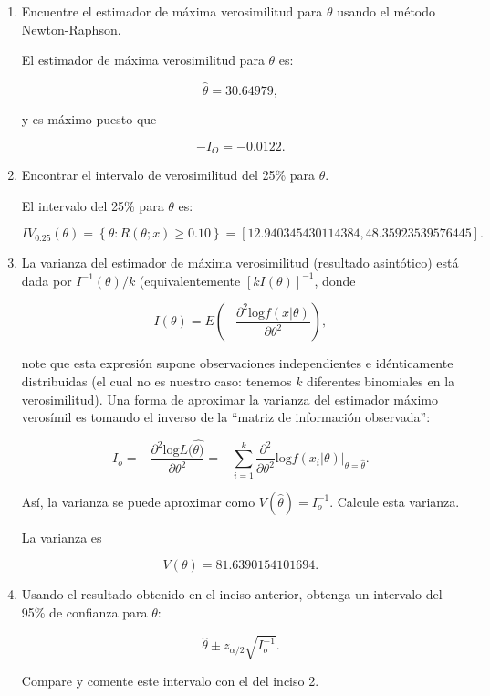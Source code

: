 \documentclass[letterpaper]{article}
\theoremstyle{definition}
\theoremstyle{lemathm}
\theoremstyle{lemathm}
\theoremstyle{lemathm}
\theoremstyle{lemademthm}
\newcommand{\pars}[1]{\left( #1 \right) }
\newcommand{\bracs}[1]{\left[ #1 \right] }
\newcommand{\set}[1]{\left \{ #1 \right\} }
\newcommand{\1}{\mathbbm{1}}
\begin{document}
	\begin{enumerate}
		\item Encuentre el estimador de m\'axima verosimilitud para $\theta$ usando el m\'etodo Newton-Raphson.
		
		El estimador de m\'axima verosimilitud para $\theta$ es:
		
		\[\hat{\theta} = 30.64979,\]
		
		y es máximo puesto que 
		
		\[-I_{O} = -0.0122.\]

		\item Encontrar el intervalo de verosimilitud del 25\% para $\theta$.
		
		El intervalo del 25\% para $\theta$ es:

		\[IV_{0.25}\pars{\theta} = \set{\theta : R\pars{\theta;x} \geq 0.10} = \bracs{12.940345430114384,48.35923539576445}.\]
		
		\item La varianza del estimador de m\'axima verosimilitud (resultado asint\'otico) est\'a dada por $I^{-1}(\theta)/k$ (equivalentemente $[kI(\theta)]^{-1}$, donde 
		
		\[I(\theta) = E\left( -\frac{\partial^2 \text{log} f(x|\theta)}{\partial \theta^2} \right),\]
		
		note que esta expresi\'on supone observaciones independientes e id\'enticamente distribuidas (el cual no es nuestro caso: tenemos $k$ diferentes binomiales en la verosimilitud). Una forma de aproximar la varianza del estimador m\'aximo veros\'imil es tomando el inverso de la ``matriz de informaci\'on observada'':

		\[I_o = -\frac{\partial^2 \text{log} L(\widehat{\theta)}}{\partial \theta^2} = -\sum_{i=1}^k \frac{\partial^2}{\partial \theta^2} \left. \text{log} f(x_i|\theta) \right |_{\theta=\widehat{\theta}}.\]

		As\'i, la varianza se puede aproximar como $V(\widehat{\theta}) = I_o^{-1}$. Calcule esta varianza.

		La varianza es

		\[V\pars{\theta} = 81.6390154101694.\]

		\item Usando el resultado obtenido en el inciso anterior, obtenga un intervalo del 95\% de confianza para $\theta$: 
		
		\[\widehat{\theta} \pm z_{\alpha/2} \sqrt{I_o^{-1}}.\]
		
		Compare y comente este intervalo con el del inciso 2.


\end{enumerate}
\end{document}
